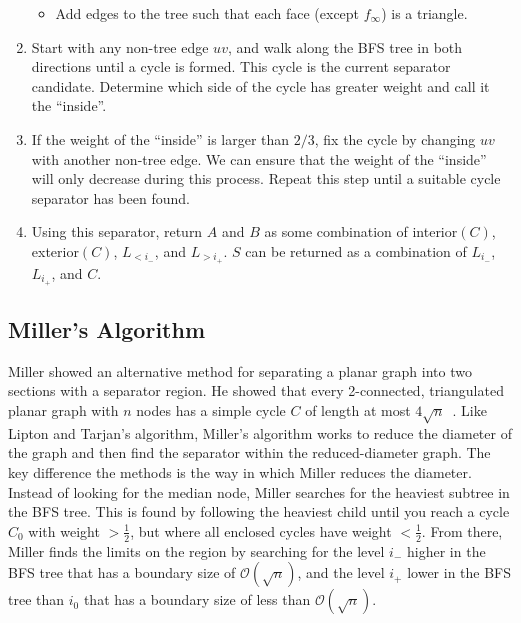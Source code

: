 \documentclass[11pt]{article}
\begin{document}
\begin{enumerate}
\begin{itemize}
        \item Add edges to the tree such that each face (except $f_{\infty}$) is a triangle.
    \end{itemize}
    
    \item Start with any non-tree edge $uv$, and walk along the BFS tree in both directions until a cycle is formed. This cycle is the current separator candidate. Determine which side of the cycle has greater weight and call it the ``inside''.
    
    \item If the weight of the ``inside'' is larger than $2/3$, fix the cycle by changing $uv$ with another non-tree edge. We can ensure that the weight of the ``inside'' will only decrease during this process. Repeat this step until a suitable cycle separator has been found.
    
    \item Using this separator, return $A$ and $B$ as some combination of interior$(C)$, exterior$(C)$, $L_{< i_-}$, and $L_{> i_+}$. $S$ can be returned as a combination of $L_{i_-}$, $L_{i_+}$, and $C$.
    
\end{enumerate}

\subsection{Miller's Algorithm}
\label{sec:graph-sep-miller}

Miller showed an alternative method for separating a planar graph into two sections with a separator region. He showed that every 2-connected, triangulated planar graph with $n$ nodes has a simple cycle $C$ of length at most $4\sqrt{n}$~\cite{miller1984finding}. Like Lipton and Tarjan's algorithm, Miller's algorithm works to reduce the diameter of the graph and then find the separator within the reduced-diameter graph. The key difference the methods is the way in which Miller reduces the diameter. Instead of looking for the median node, Miller searches for the heaviest subtree in the BFS tree. This is found by following the heaviest child until you reach a cycle $C_0$ with weight $> \frac{1}{2}$, but where all enclosed cycles have weight $< \frac{1}{2}$. From there, Miller finds the limits on the region by searching for the level $i_-$ higher in the BFS tree that has a boundary size of $\mathcal{O}(\sqrt{n})$, and the level $i_+$ lower in the BFS tree than $i_0$ that has  a boundary size of less than $\mathcal{O}(\sqrt{n})$.
\end{document}
